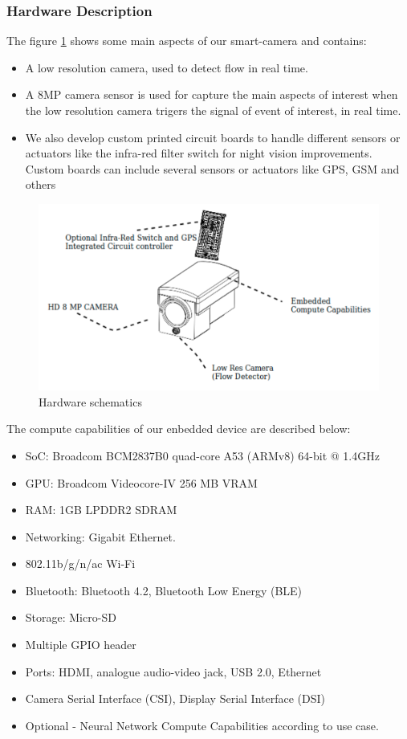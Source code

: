 \subsubsection{Hardware Description}

The figure \ref{fig:hardware_dec} shows some main aspects of our smart-camera and contains:
\begin{itemize}
	\item A low resolution camera, used to detect flow in real time.
	\item A 8MP camera sensor is used for capture the main aspects of interest when the low resolution camera trigers the signal of event of interest, in real time.
	\item We also develop custom printed circuit boards to handle different sensors or actuators like the infra-red filter switch for night vision improvements. Custom boards can include several sensors or actuators like GPS, GSM and others 
\end{itemize} 

\begin{figure}[b]\centering
	\includegraphics[width=\linewidth]{images/hardware_desc}
	\caption{Hardware schematics}
	\label{fig:hardware_dec}
\end{figure}

The compute capabilities of our enbedded device are described below:

\begin{itemize}[noitemsep]

\item SoC: Broadcom BCM2837B0 quad-core A53 (ARMv8) 64-bit @ 1.4GHz
\item GPU: Broadcom Videocore-IV 256 MB VRAM
\item RAM: 1GB LPDDR2 SDRAM
\item Networking: Gigabit Ethernet.
\item 802.11b/g/n/ac Wi-Fi
\item Bluetooth: Bluetooth 4.2, Bluetooth Low Energy (BLE)
\item Storage: Micro-SD
\item Multiple GPIO header
\item Ports: HDMI, analogue audio-video jack, USB 2.0, Ethernet
\item Camera Serial Interface (CSI), Display Serial Interface (DSI)
\item Optional - Neural Network Compute Capabilities according to use case.
\end{itemize}


